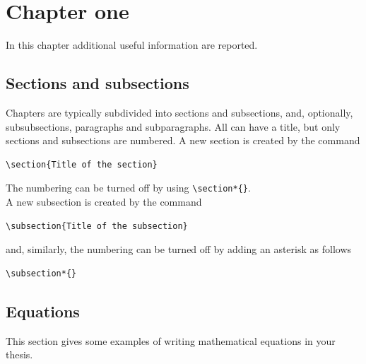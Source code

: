 \documentclass{Configuration_Files/PoliMi3i_thesis}
\begin{document}
\mainmatter %

\chapter{Chapter one}
\label{ch:chapter_one}%

In this chapter additional useful information are reported.

\section{Sections and subsections}
\label{sec:section_name}
Chapters are typically subdivided into sections and subsections, and, optionally,
subsubsections, paragraphs and subparagraphs.
All can have a title, but only sections and subsections are numbered.
A new section is created by the command
\begin{verbatim}
\section{Title of the section}
\end{verbatim}
The numbering can be turned off by using \verb|\section*{}|.
\\
A new subsection is created by the command
\begin{verbatim}
\subsection{Title of the subsection}
\end{verbatim}
and, similarly, the numbering can be turned off by adding an asterisk as follows
\begin{verbatim}
\subsection*{}
\end{verbatim}

\section{Equations}
\label{sec:eqs}
This section gives some examples of writing mathematical equations in your thesis.
\end{document}
